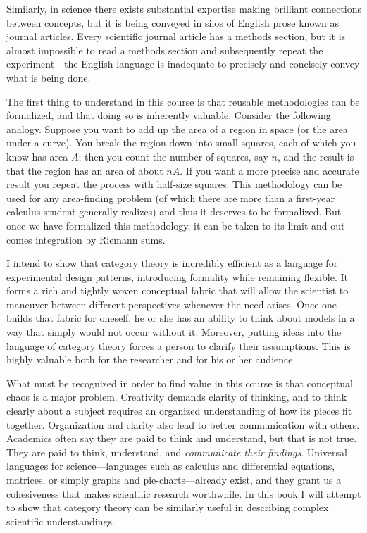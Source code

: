 Similarly, in science there exists substantial expertise making brilliant connections between concepts, but it is being conveyed in silos of English prose known as journal articles. Every scientific journal article has a methods section, but it is almost impossible to read a methods section and subsequently repeat the experiment---the English language is inadequate to precisely and concisely convey what is being done.

The first thing to understand in this course is that reusable methodologies can be formalized, and that doing so is inherently valuable. Consider the following analogy. Suppose you want to add up the area of a region in space (or the area under a curve). You break the region down into small squares, each of which you know has area $A$; then you count the number of squares, say $n$, and the result is that the region has an area of about $nA$. If you want a more precise and accurate result you repeat the process with half-size squares. This methodology can be used for any area-finding problem (of which there are more than a first-year calculus student generally realizes) and thus it deserves to be formalized. But once we have formalized this methodology, it can be taken to its limit and out comes integration by Riemann sums. 

I intend to show that category theory is incredibly efficient as a language for experimental design patterns, introducing formality while remaining flexible. It forms a rich and tightly woven conceptual fabric that will allow the scientist to maneuver between different perspectives whenever the need arises. Once one builds that fabric for oneself, he or she has an ability to think about models in a way that simply would not occur without it.  Moreover, putting ideas into the language of category theory forces a person to clarify their assumptions. This is highly valuable both for the researcher and for his or her audience.

What must be recognized in order to find value in this course is that conceptual chaos is a major problem. Creativity demands clarity of thinking, and to think clearly about a subject requires an organized understanding of how its pieces fit together. Organization and clarity also lead to better communication with others. Academics often say they are paid to think and understand, but that is not true. They are paid to think, understand, and {\em communicate their findings}. Universal languages for science---languages such as calculus and differential equations, matrices, or simply graphs and pie-charts---already exist, and they grant us a cohesiveness that makes scientific research worthwhile. In this book I will attempt to show that category theory can be similarly useful in describing complex scientific understandings.
